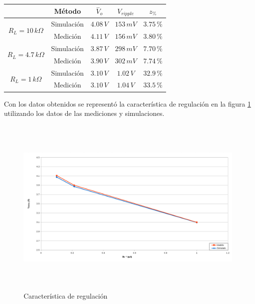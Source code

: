 \documentclass[10pt,spanish,a4paper,openany,notitlepage]{article}
\begin{document}
\begin{table}[H]
\centering
\begin{tabular}{c|c|c|c|c|}
\cline{2-5}
& Método     &  $\overset{-}{V}_{o}$  & ${V}_{ripple}$ & $z_{\%}$ \\ \hline

\multicolumn{1}{|c|}{\multirow{2}{*}{$R_L = 10\,\unit{k\Omega}$}} & Simulación & $4.08\,\unit{V}$ & $153\,\unit{mV}$ & $3.75\,\unit{\%}$ \\ \cline{2-5}
\multicolumn{1}{|c|}{} & Medición & $4.11\,\unit{V}$ & $156\,\unit{mV}$ & $3.80\,\unit{\%}$     \\ \hline

\multicolumn{1}{|c|}{\multirow{2}{*}{$R_L = 4.7\,\unit{k\Omega}$}} & Simulación & $3.87\,\unit{V}$ & $298\,\unit{mV}$ & $7.70\,\unit{\%}$ \\ \cline{2-5}
\multicolumn{1}{|c|}{} & Medición & $3.90\,\unit{V}$ & $302\,\unit{mV}$ & $7.74\,\unit{\%}$   \\ \hline

\multicolumn{1}{|c|}{\multirow{2}{*}{$R_L = 1\,\unit{k\Omega}$}} & Simulación & $3.10\,\unit{V}$ & $1.02\,\unit{V}$ & $32.9\,\unit{\%}$ \\ \cline{2-5}
\multicolumn{1}{|c|}{} & Medición & $3.10\,\unit{V}$ & $1.04\,\unit{V}$ & $33.5\,\unit{\%}$     \\ \hline

\end{tabular}
\label{table:F1_z_ripple}
\end{table}


Con los datos obtenidos se representó la característica de regulación en la figura \ref{fig:F1_caracteristica_regulacion} utilizando los datos de las mediciones y simulaciones.

\begin{figure}[H]
\centering
\includegraphics[width=350pt, height=250pt]{mediciones/F1.png}
\caption{Característica de regulación}
\label{fig:F1_caracteristica_regulacion}
\end{figure}
\end{document}

